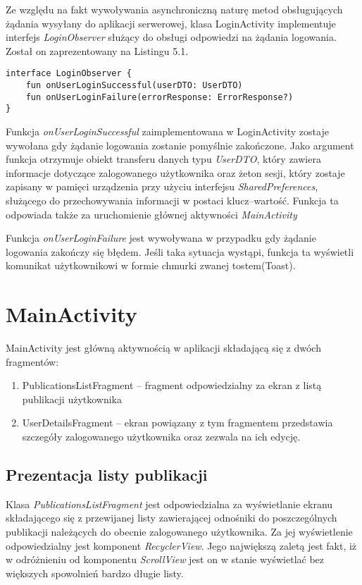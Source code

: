 \documentclass[a4paper,12pt,twoside,openany]{report}
\begin{document}
 Ze względu na fakt wywoływania asynchroniczną naturę metod obsługujących żądania wysyłany do aplikacji serwerowej, klasa LoginActivity implementuje interfejs \textit{LoginObserver} służący do obsługi odpowiedzi na żądania logowania. Został on zaprezentowany na Listingu 5.1.
 \begin{lstlisting}[caption=Interfejs LoginObserver,label=code1,captionpos=b]
interface LoginObserver {
	fun onUserLoginSuccessful(userDTO: UserDTO)  
	fun onUserLoginFailure(errorResponse: ErrorResponse?)
}
 \end{lstlisting} 


Funkcja \textit{onUserLoginSuccessful} zaimplementowana w LoginActivity zostaje wywołana gdy żądanie logowania zostanie pomyślnie zakończone. Jako argument funkcja otrzymuje obiekt transferu danych typu \textit{UserDTO}, który zawiera informacje dotyczące zalogowanego użytkownika oraz żeton sesji, który zostaje zapisany w pamięci urządzenia przy użyciu interfejsu \textit{SharedPreferences}, służącego do przechowywania informacji w postaci klucz--wartość. Funkcja ta odpowiada także za uruchomienie głównej aktywności \textit{MainActivity}

Funkcja \textit{onUserLoginFailure} jest wywoływana w przypadku gdy żądanie logowania zakończy się błędem. Jeśli taka sytuacja wystąpi, funkcja ta wyświetli komunikat użytkownikowi w formie chmurki zwanej tostem(Toast).

\section{MainActivity}
MainActivity jest główną aktywnością w aplikacji składającą się z dwóch fragmentów: 
\begin{enumerate}
	\item PublicationsListFragment -- fragment odpowiedzialny za ekran z listą publikacji użytkownika
	\item UserDetailsFragment -- ekran powiązany z tym fragmentem przedstawia szczegóły zalogowanego użytkownika oraz zezwala na ich edycję.
\end{enumerate}

\subsection{Prezentacja listy publikacji}
Klasa \textit{PublicationsListFragment} jest odpowiedzialna za wyświetlanie ekranu składającego się z przewijanej listy zawierającej odnośniki do poszczególnych publikacji należących do obecnie zalogowanego użytkownika. Za jej wyświetlenie odpowiedzialny jest komponent \textit{RecyclerView}. Jego największą zaletą jest fakt, iż w odróżnieniu od komponentu \textit{ScrollView} jest on w stanie wyświetlać bez większych spowolnień bardzo długie listy. 
\end{document}
